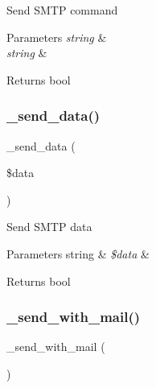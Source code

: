 Send S\+M\+TP command


\begin{DoxyParams}{Parameters}
{\em string} & \\
\hline
{\em string} & \\
\hline
\end{DoxyParams}
\begin{DoxyReturn}{Returns}
bool 
\end{DoxyReturn}
\mbox{\label{class_c_i___email_a42fa768e8678b3c1462762b9b812a302}} 
\subsubsection{\texorpdfstring{\+\_\+send\+\_\+data()}{\_send\_data()}}
{\footnotesize\ttfamily \+\_\+send\+\_\+data (\begin{DoxyParamCaption}\item[{}]{\$data }\end{DoxyParamCaption})\hspace{0.3cm}{\ttfamily [protected]}}

Send S\+M\+TP data


\begin{DoxyParams}[1]{Parameters}
string & {\em \$data} & \\
\hline
\end{DoxyParams}
\begin{DoxyReturn}{Returns}
bool 
\end{DoxyReturn}
\mbox{\label{class_c_i___email_ae7e626556c4d619a7214bee6056badd4}} 
\subsubsection{\texorpdfstring{\+\_\+send\+\_\+with\+\_\+mail()}{\_send\_with\_mail()}}
{\footnotesize\ttfamily \+\_\+send\+\_\+with\+\_\+mail (\begin{DoxyParamCaption}{ }\end{DoxyParamCaption})\hspace{0.3cm}{\ttfamily [protected]}}

